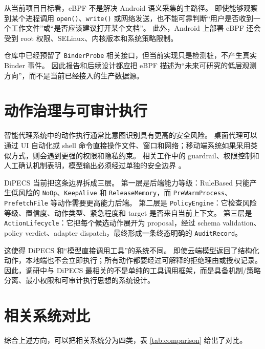 \documentclass[12pt,a4paper]{article}
\begin{document}
从当前项目目标看，eBPF 不是解决 Android 语义采集的主路径。
即使能够观察到某个进程调用 \texttt{open()}、\texttt{write()} 或网络发送，也不能可靠判断``用户是否收到一个工作文件''或``是否应该建议打开某个文档''。
此外，Android 上部署 eBPF 还会受到 root 权限、SELinux、内核版本和系统策略限制。

仓库中已经预留了 \texttt{BinderProbe} 相关接口，但当前实现只是检测桩，不产生真实 Binder 事件。
因此报告和后续设计都应把 eBPF 描述为``未来可研究的低层观测方向''，而不是当前已经接入的生产数据源。

\section{动作治理与可审计执行}\label{sec:governance}

智能代理系统中的动作执行通常比意图识别具有更高的安全风险。
桌面代理可以通过 UI 自动化或 shell 命令直接操作文件、窗口和网络；移动端系统如果采用类似方式，则会遇到更强的权限和隐私约束。
相关工作中的 guardrail、权限控制和人工确认机制表明，模型输出必须经过单独的安全边界 \cite{xi2023rise}。

DiPECS 当前把这条边界拆成三层。
第一层是后端能力等级：RuleBased 只能产生低风险的 \texttt{NoOp}、\texttt{KeepAlive} 和 \texttt{ReleaseMemory}，而 \texttt{PreWarmProcess}、\texttt{PrefetchFile} 等动作需要更高能力后端。
第二层是 \texttt{PolicyEngine}：它检查风险等级、置信度、动作类型、紧急程度和 target 是否来自当前上下文。
第三层是 \texttt{ActionLifecycle}：它把每个候选动作展开为 proposal，经过 schema validation、policy verdict、adapter dispatch，最终形成一条终态明确的 \texttt{AuditRecord}。

这使得 DiPECS 和``模型直接调用工具''的系统不同。
即使云端模型返回了结构化动作，本地端也不会立即执行；所有动作都要经过可解释的拒绝理由或授权记录。
因此，调研中与 DiPECS 最相关的不是单纯的工具调用框架，而是具备机制/策略分离、最小权限和可审计执行思想的系统设计。

\section{相关系统对比}\label{sec:comparison}

综合上述方向，可以把相关系统分为四类，表 \ref{tab:comparison} 给出了对比。
\end{document}
